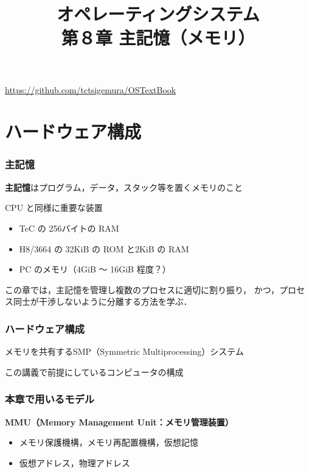 \documentclass{beamer}                   %
\begin{document}
\title[主記憶]
      {オペレーティングシステム\\第８章 主記憶（メモリ）}
\date{}

\begin{frame}
  \titlepage
  \centerline{\url{https://github.com/tctsigemura/OSTextBook}}
\end{frame}


\section{ハードウェア構成}
\begin{frame}
  \frametitle{主記憶}

{\bf 主記憶}はプログラム，データ，スタック等を置くメモリのこと

CPU と同様に重要な装置

\begin{itemize}
\item TeC の 256バイトの RAM
\item H8/3664 の 32KiB の ROM と2KiB の RAM
\item PC のメモリ（4GiB 〜 16GiB 程度？）
\end{itemize}

この章では，主記憶を管理し複数のプロセスに適切に割り振り，
かつ，プロセス同士が干渉しないように分離する方法を学ぶ．
\end{frame}

\begin{frame}
  \frametitle{ハードウェア構成}
  メモリを共有するSMP（Symmetric Multiprocessing）システム
  \begin{center}
    この講義で前提にしているコンピュータの構成
  \end{center}
\end{frame}

\begin{frame}
  \frametitle{本章で用いるモデル}
      {\bf MMU（Memory Management Unit：メモリ管理装置）}
      \begin{itemize}
      \item メモリ保護機構，メモリ再配置機構，仮想記憶
      \item 仮想アドレス，物理アドレス
      \end{itemize}
\end{frame}
\end{document}
